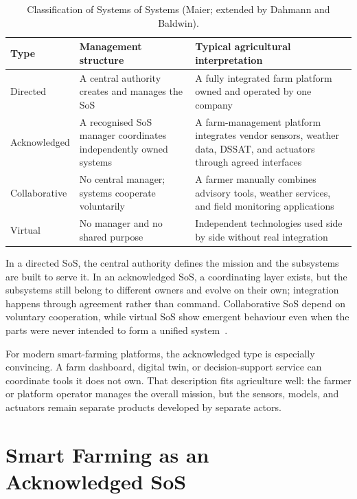 \begin{table}[ht]
  \centering
  \caption{Classification of Systems of Systems (Maier; extended by Dahmann and Baldwin).}
  \label{tab:sos_taxonomy}
  \begin{tabular}{p{2.5cm} p{4.5cm} p{6.5cm}}
    \toprule
    \textbf{Type} & \textbf{Management structure} & \textbf{Typical agricultural interpretation} \\
    \midrule
    Directed &
    A central authority creates and manages the SoS &
    A fully integrated farm platform owned and operated by one company \\[4pt]

    Acknowledged &
    A recognised SoS manager coordinates independently owned systems &
    A farm-management platform integrates vendor sensors, weather data, DSSAT, and actuators through agreed interfaces \\[4pt]

    Collaborative &
    No central manager; systems cooperate voluntarily &
    A farmer manually combines advisory tools, weather services, and field monitoring applications \\[4pt]

    Virtual &
    No manager and no shared purpose &
    Independent technologies used side by side without real integration \\
    \bottomrule
  \end{tabular}
\end{table}

In a directed SoS, the central authority defines the mission and the subsystems
are built to serve it. In an acknowledged SoS, a coordinating layer exists, but
the subsystems still belong to different owners and evolve on their own;
integration happens through agreement rather than command. Collaborative SoS
depend on voluntary cooperation, while virtual SoS show emergent behaviour even
when the parts were never intended to form a unified
system~\cite{maier1998architecting, nielsen2015sos}.

For modern smart-farming platforms, the acknowledged type is especially
convincing. A farm dashboard, digital twin, or decision-support service can
coordinate tools it does not own. That description fits agriculture well: the
farmer or platform operator manages the overall mission, but the sensors,
models, and actuators remain separate products developed by separate actors.


\section{Smart Farming as an Acknowledged SoS}
\label{sec:smart_farming_sos}

